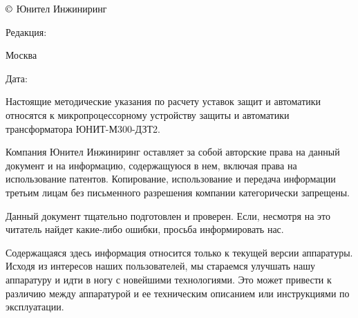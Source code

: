 
\pagestyle{fancy}
\fancyhf{}
\renewcommand{\headrulewidth}{1pt}
\lhead{\color{black}{ЮТКБ.656122.609 ДЗТ2.РР1 Редакция \rev~от~\revdate}}
\rfoot{{\thepage}}
\renewcommand{\footrulewidth}{1pt}


\pagecolor{white}

\noindent
$\copyright$ \the\year{} Юнител Инжиниринг
\hfill
\parbox{0.3\textwidth}{\raggedleft Редакция: \textcolor{unigray}{\rev}}

\vskip 3mm
\noindent
Москва
\hfill
\parbox{0.3\textwidth}{\raggedleft Дата: \textcolor{unigray}{\revdate}}
\vskip 8mm

\vskip 60mm


\noindent
Настоящие методические указания по расчету уставок защит и автоматики относятся к микропроцессорному устройству защиты и автоматики трансформатора ЮНИТ-М300-ДЗТ2.

\vskip 10mm
Компания Юнител Инжиниринг оставляет за собой авторские права на данный документ и на информацию, содержащуюся в нем, включая права на использование патентов. Копирование, использование и передача информации третьим лицам без письменного разрешения компании категорически запрещены.

\vskip 10mm
Данный документ тщательно подготовлен и проверен. Если, несмотря на это читатель найдет какие-либо ошибки, просьба информировать нас.

\vskip 10mm
Содержащаяся здесь информация относится только к текущей версии аппаратуры. Исходя из интересов наших пользователей, мы стараемся улучшать нашу аппаратуру и идти в ногу с новейшими технологиями. Это может привести к различию между аппаратурой и ее техническим описанием или инструкциями по эксплуатации.



